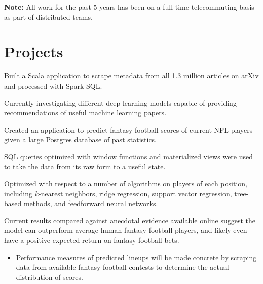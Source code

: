 \documentclass[]{deedy-resume-openfont}
\begin{document}
\begin{minipage}[t]{0.66\textwidth}
\textbf{Note:} All work for the past 5 years has been on a full-time telecommuting basis as part of distributed teams.
\section{Projects}
\begin{tightemize}
\item Built a Scala application to scrape metadata from all 1.3 million articles on arXiv and processed with Spark SQL.
\item Currently investigating different deep learning models capable of providing recommendations of useful machine learning papers.
\end{tightemize}
\begin{tightemize} 
\item Created an application to predict fantasy football scores of current NFL players given a \href{https://github.com/BurntSushi/nfldb}{large Postgres database} of past statistics.
\item SQL queries optimized with window functions and materialized views were used to take the data from its raw form to a useful state.
\item Optimized with respect to a number of algorithms on players of each position, including $k$-nearest neighbors, ridge regression, support vector regression, tree-based methods, and feedforward neural networks.
\item Current results compared against anecdotal evidence available online suggest the model can outperform average human fantasy football players, and likely even have a positive expected return on fantasy football bets.
  \begin{itemize}
  \item Performance measures of predicted lineups will be made concrete by scraping data from available fantasy football contests to determine the actual distribution of scores.
  \end{itemize}
\end{tightemize}


\end{minipage}
\end{document}
